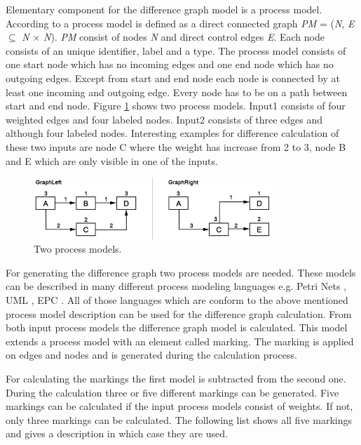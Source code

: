 \documentclass{llncs}
\begin{document}
Elementary component for the difference graph model is a process model. According to \cite{lit:VisuApprDiffAnalysis} a process model is defined as a direct connected graph \textit{PM} = (\textit{N}, \textit{E} $\subseteq$ \textit{N} $\times$ \textit{N}). \textit{PM} consist of nodes \textit{N} and direct control edges \textit{E}. Each node consists of an unique identifier, label and a type.
The process model consists of one start node which has no incoming edges and one end node which has no outgoing edges. Except from start and end node each node is connected by at least one incoming and outgoing edge. Every node has to be on a path between start and end node. Figure \ref{fig:ProcessModels} shows two process models. Input1 consists of four weighted edges and four labeled nodes. Input2 consists of three edges and although four labeled nodes. Interesting examples for difference calculation of these two inputs are node C where the weight has increase from 2 to 3, node B and E which are only visible in one of the inputs.

\begin{figure}
	\centering
	\includegraphics[width=0.8\textwidth]{Images/ProcessModels.PNG}
	\caption{Two process models.}
	\label{fig:ProcessModels}
\end{figure}


For generating the difference graph two process models are needed. These models can be described in many different process modeling languages e.g. Petri Nets \cite{lit:Petrinet}, UML \cite{lit:UML}, EPC \cite{lit:EPC}. All of those languages which are conform to the above mentioned process model description can be used for the difference graph calculation. From both input process models the difference graph model is calculated. This model extends a process model with an element called marking. The marking is applied on edges and nodes and is generated during the calculation process.


For calculating the markings the first model is subtracted from the second one. During the calculation three or five different markings can be generated. Five markings can be calculated if the input process models consist of weights. If not, only three markings can be calculated. The following list shows all five markings and gives a description in which case they are used. 
\end{document}
